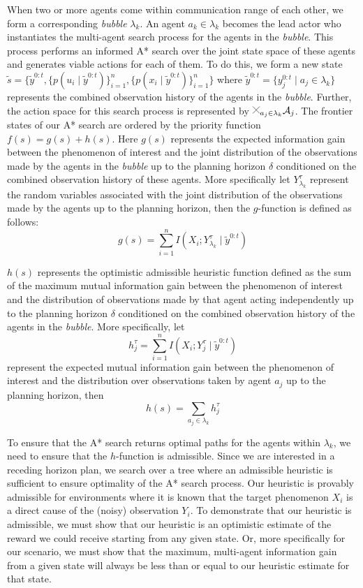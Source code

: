 \documentclass[letterpaper, 10 pt, conference]{IEEEConference}
\newcommand{\cross}{
  \begin{tikzpicture}[scale=0.25]
    \draw (0,0) -- (1,1);
    \draw (0,1) -- (1,0);
  \end{tikzpicture}
}
\begin{document}
When two or more agents come within communication range of each other, we form a corresponding \textit{bubble} $\lambda_k$. An agent $a_k \in \lambda_k$ becomes the lead actor who instantiates the multi-agent search process for the agents in the \textit{bubble}. This process performs an informed A* search over the joint state space of these agents and generates viable actions for each of them. To do this, we form a new state $\tilde{s} = \{ \tilde{y}^{0:t}, \lbrace p(u_i \mid \tilde{y}^{0:t}) \rbrace_{i=1}^{n},  \lbrace p(x_i \mid \tilde{y}^{0:t}) \rbrace_{i=1}^{n} \}$ where $\tilde{y}^{0:t} = \{y_j^{0:t} \mid a_j \in \lambda_k \}$ represents the combined observation history of the agents in the \textit{bubble}. Further, the action space for this search process is represented by $\cross_{a_j \in \lambda_k} \mathcal{A}_j$. The frontier states of our A* search are ordered by the priority function $f(s) = g(s) + h(s)$. Here $g(s)$ represents the expected information gain between the phenomenon of interest and the joint distribution of the observations made by the agents in the \textit{bubble} up to the planning horizon $\delta$ conditioned on the combined observation history of these agents. More specifically let $Y_{\lambda_k}^{\tau}$ represent the random variables associated with the joint distribution of the observations made by the agents up to the planning horizon, then the $g$-function is defined as follows:
\begin{dmath*}
    g(s) = \sum_{i=1}^n I{(X_i; Y_{\lambda_k}^{\tau} \mid \tilde{y}^{0:t})} 
\end{dmath*}
    
$h(s)$ represents the optimistic admissible heuristic function defined as the sum of the maximum mutual information gain between the phenomenon of interest and the distribution of observations made by that agent acting independently up to the planning horizon $\delta$ conditioned on the combined observation history of the agents in the \textit{bubble}. More specifically, let 
\begin{dmath*}
    h_j^{\tau} = \sum_{i=1}^n I{(X_i; Y_j^{\tau} \mid \tilde{y}^{0:t})} 
\end{dmath*}
represent the expected mutual information gain between the phenomenon of interest and the distribution over observations taken by agent $a_j$ up to the planning horizon, then 
\[
    h(s) = \sum_{a_j \in \lambda_k} h_j^{\tau}
\]

To ensure that the A* search returns optimal paths for the agents within $\lambda_k$, we need to ensure that the $h$-function is admissible. Since we are interested in a receding horizon plan, we search over a tree where an admissible heuristic is sufficient to ensure optimality of the A* search process. Our heuristic is provably admissible for environments where it is known that the target phenomenon $X_i$ is a direct cause of the (noisy) observation $Y_i$. To demonstrate that our heuristic is admissible, we must show that our heuristic is an optimistic estimate of the reward we could receive starting from any given state. Or, more specifically for our scenario, we must show that the maximum, multi-agent information gain from a given state will always be less than or equal to our heuristic estimate for that state. 
\end{document}
